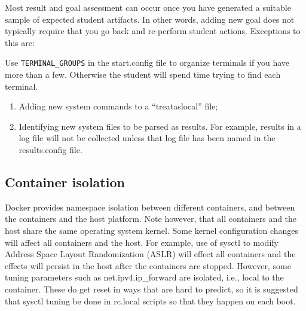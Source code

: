 \documentclass[12pt]{article}
\begin{document}
Most result and goal assessment can occur once you have generated a suitable sample of
expected student artifacts.  In other words, adding new goal does not typically require
that you go back and re-perform student actions.  Exceptions to this are:

Use {\tt TERMINAL\_GROUPS} in the start.config file to organize terminals if you have more
than a few.  Otherwise the student will spend time trying to find each terminal.

\begin{enumerate}
\item Adding new system commands to a ``treataslocal'' file;
\item Identifying new system files to be parsed as results.  For example, results in a log
file will not be collected unless that log file has been named in the results.config file.
\end{enumerate}

\subsection {Container isolation}
Docker provides namespace isolation between different containers, and
between the containers and the host platform.  Note however, that all
containers and the host share the same operating system kernel.  Some
kernel configuration changes will affect all containers and the host.  For example,
use of sysctl to modify Address Space Layout Randomization (ASLR) will effect
all containers and the effects will persist in the host after the containers
are stopped.  However, some tuning parameters such as net.ipv4.ip\_forward are
isolated, i.e., local to the container. These do get reset in ways that are
hard to predict, so it is suggested that sysctl tuning be done in rc.local
scripts so that they happen on each boot.
\end{document}
